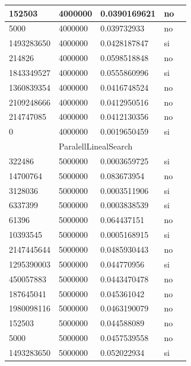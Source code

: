 \documentclass[12pt, fleqn]{article}                             %
\theoremstyle{break}                                            %
\begin{document}
\begin{longtable}{|m{5em}|m{5em}|m{10em}|m{5em}|@{}m{0pt}@{}}
            152503& 4000000  & 0.0390169621 & no &\\[1em]    \hline
            5000& 4000000  & 0.039732933 & no &\\[1em]    \hline
            1493283650& 4000000  & 0.0428187847 & si &\\[1em]    \hline
            214826& 4000000  & 0.0598518848 & no &\\[1em]    \hline
            1843349527& 4000000  & 0.0555860996 & si &\\[1em]    \hline
            1360839354& 4000000  & 0.0416748524 & no &\\[1em]    \hline
            2109248666& 4000000  & 0.0412950516 & no &\\[1em]    \hline
            214747085& 4000000  & 0.0412130356 & no &\\[1em]    \hline
            0& 4000000  & 0.0019650459 & si &\\[1em]    \hline
            \multicolumn{5}{|c|}{ParalellLinealSearch}   \\          \hline
            322486& 5000000  & 0.0003659725 & si &\\[1em]    \hline
            14700764& 5000000  & 0.083673954 & no &\\[1em]    \hline
            3128036& 5000000  & 0.0003511906 & si &\\[1em]    \hline
            6337399& 5000000  & 0.0003838539 & si &\\[1em]    \hline
            61396& 5000000  & 0.064437151 & no &\\[1em]    \hline
            10393545& 5000000  & 0.0005168915 & si &\\[1em]    \hline
            2147445644& 5000000  & 0.0485930443 & no &\\[1em]    \hline
            1295390003& 5000000  & 0.044770956 & si &\\[1em]    \hline
            450057883& 5000000  & 0.0443470478 & no &\\[1em]    \hline
            187645041& 5000000  & 0.045361042 & no &\\[1em]    \hline
            1980098116& 5000000  & 0.0463190079 & no &\\[1em]    \hline
            152503& 5000000  & 0.044588089 & no &\\[1em]    \hline
            5000& 5000000  & 0.0457539558 & no &\\[1em]    \hline
            1493283650& 5000000  & 0.052022934 & si &\\[1em]    \hline

\end{longtable}
\end{document}
